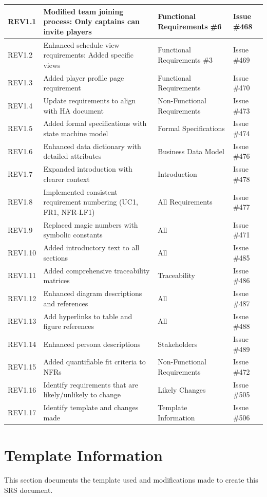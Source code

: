 \documentclass[12pt, titlepage]{article}
\begin{document}
\begin{longtable}{|p{}|p{}|p{}|p{}|}
REV1.1 & Modified team joining process: Only captains can invite players & Functional Requirements \#6 & Issue \#468 \\
\hline
REV1.2 & Enhanced schedule view requirements: Added specific views & Functional Requirements \#3 & Issue \#469 \\
\hline
REV1.3 & Added player profile page requirement & Functional Requirements & Issue \#470 \\
\hline
REV1.4 & Update requirements to align with HA document & Non-Functional Requirements & Issue \#473 \\
\hline
REV1.5 & Added formal specifications with state machine model & Formal Specifications & Issue \#474 \\
\hline
REV1.6 & Enhanced data dictionary with detailed attributes & Business Data Model & Issue \#476 \\
\hline
REV1.7 & Expanded introduction with clearer context & Introduction & Issue \#478 \\
\hline
REV1.8 & Implemented consistent requirement numbering (UC1, FR1, NFR-LF1) & All Requirements & Issue \#477 \\
\hline
REV1.9 & Replaced magic numbers with symbolic constants & All & Issue \#471 \\
\hline
REV1.10 & Added introductory text to all sections & All & Issue \#485 \\
\hline
REV1.11 & Added comprehensive traceability matrices & Traceability & Issue \#486 \\
\hline
REV1.12 & Enhanced diagram descriptions and references & All & Issue \#487 \\
\hline
REV1.13 & Add hyperlinks to table and figure references & All & Issue \#488 \\
\hline
REV1.14 & Enhanced persona descriptions & Stakeholders & Issue \#489 \\
\hline
REV1.15 & Added quantifiable fit criteria to NFRs & Non-Functional Requirements & Issue \#472 \\
\hline
REV1.16 & Identify requirements that are likely/unlikely to change & Likely Changes & Issue \#505 \\
\hline
REV1.17 & Identify template and changes made & Template Information & Issue \#506 \\
\hline
\end{longtable}

\section{Template Information}
This section documents the template used and modifications made to create this SRS document.
\end{document}
